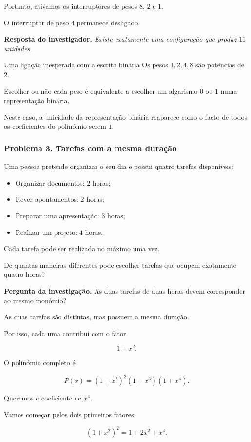 \documentclass[11pt,a4paper,oneside]{book}
\newcommand{\Pergunta}[1]{\begin{perguntabox}\textbf{Pergunta da investigação.} #1\end{perguntabox}}
\newcommand{\Resposta}[1]{\textcolor{verdeescuro}{\textbf{Resposta do investigador.}} \emph{#1}\par}
\begin{document}
Portanto, ativamos os interruptores
de pesos $8$, $2$ e $1$.

O interruptor de peso $4$
permanece desligado.

\Resposta{Existe exatamente uma
configuração que produz $11$ unidades.}

\begin{observacaobox}{Uma ligação inesperada com a escrita binária}
Os pesos $1,2,4,8$ são potências de $2$.

Escolher ou não cada peso é equivalente
a escolher um algarismo $0$ ou $1$
numa representação binária.

Neste caso, a unicidade da representação
binária reaparece como o facto de todos
os coeficientes do polinómio serem $1$.
\end{observacaobox}

\subsubsection*{Problema 3. Tarefas com a mesma duração}

Uma pessoa pretende organizar o seu dia
e possui quatro tarefas disponíveis:

\begin{itemize}
\item Organizar documentos: $2$ horas;
\item Rever apontamentos: $2$ horas;
\item Preparar uma apresentação: $3$ horas;
\item Realizar um projeto: $4$ horas.
\end{itemize}

Cada tarefa pode ser realizada
no máximo uma vez.

De quantas maneiras diferentes
pode escolher tarefas que ocupem
exatamente quatro horas?

\Pergunta{As duas tarefas de duas horas
devem corresponder ao mesmo monómio?}

As duas tarefas são distintas,
mas possuem a mesma duração.

Por isso, cada uma contribui
com o fator

\[
1+x^2.
\]

O polinómio completo é

\[
P(x)=(1+x^2)^2(1+x^3)(1+x^4).
\]

Queremos o coeficiente de $x^4$.

Vamos começar pelos dois primeiros fatores:

\[
(1+x^2)^2=1+2x^2+x^4.
\]
\end{document}
